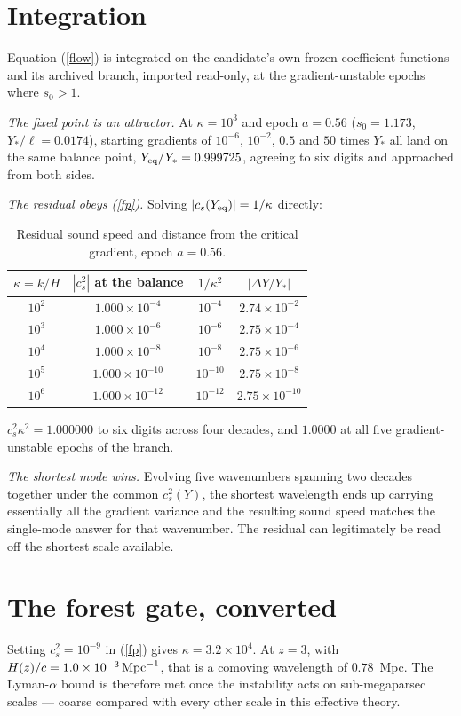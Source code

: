 \documentclass[11pt,letterpaper]{article}
\begin{document}
\section{Integration}
Equation (\ref{flow}) is integrated on the candidate's own frozen coefficient functions and its archived branch, imported read-only, at the gradient-unstable epochs where $s_0>1$.

\emph{The fixed point is an attractor.} At $\kappa=10^3$ and epoch $a=0.56$ ($s_0=1.173$, $Y_*/\ell=0.0174$), starting gradients of $10^{-6}$, $10^{-2}$, $0.5$ and $50$ times $Y_*$ all land on the same balance point, $Y_{\rm eq}/Y_*=0.999725$, agreeing to six digits and approached from both sides.

\emph{The residual obeys (\ref{fp}).} Solving $|c_s(Y_{\rm eq})|=1/\kappa$ directly:
\begin{table}[h]\centering\caption{Residual sound speed and distance from the critical gradient, epoch $a=0.56$.}\label{tab}
\begin{tabular}{cccc}\toprule
$\kappa=k/H$ & $|c_s^2|$ at the balance & $1/\kappa^2$ & $|\Delta Y/Y_*|$\\\midrule
$10^2$ & $1.000\times10^{-4}$ & $10^{-4}$ & $2.74\times10^{-2}$\\
$10^3$ & $1.000\times10^{-6}$ & $10^{-6}$ & $2.75\times10^{-4}$\\
$10^4$ & $1.000\times10^{-8}$ & $10^{-8}$ & $2.75\times10^{-6}$\\
$10^5$ & $1.000\times10^{-10}$ & $10^{-10}$ & $2.75\times10^{-8}$\\
$10^6$ & $1.000\times10^{-12}$ & $10^{-12}$ & $2.75\times10^{-10}$\\\bottomrule
\end{tabular}\end{table}
$c_s^2\kappa^2=1.000000$ to six digits across four decades, and $1.0000$ at all five gradient-unstable epochs of the branch.

\emph{The shortest mode wins.} Evolving five wavenumbers spanning two decades together under the common $c_s^2(Y)$, the shortest wavelength ends up carrying essentially all the gradient variance and the resulting sound speed matches the single-mode answer for that wavenumber. The residual can legitimately be read off the shortest scale available.

\section{The forest gate, converted}
Setting $c_s^2=10^{-9}$ in (\ref{fp}) gives $\kappa=3.2\times10^4$. At $z=3$, with $H(z)/c=1.0\times10^{-3}\,{\rm Mpc}^{-1}$, that is a comoving wavelength of $0.78$~Mpc. The Lyman-$\alpha$ bound is therefore met once the instability acts on sub-megaparsec scales --- coarse compared with every other scale in this effective theory.
\end{document}
